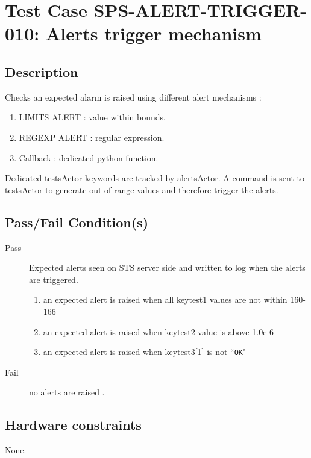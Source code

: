 \section{Test Case SPS-ALERT-TRIGGER-010: Alerts trigger mechanism}

\subsection{Description}

Checks an expected alarm is raised using different alert mechanisms :
\begin{enumerate}
    \item LIMITS ALERT :  value within bounds.
    \item REGEXP ALERT : regular expression.
    \item Callback : dedicated python function.
\end{enumerate}

Dedicated testsActor keywords are tracked by alertsActor.
A command is sent to testsActor to generate out of range values and therefore trigger the alerts.


\subsection{Pass/Fail Condition(s)}

\begin{description}
\item [Pass] Expected alerts seen on STS server side and written to log when the alerts are triggered.

\begin{enumerate}
    \item an expected alert is raised when all keytest1 values are not within 160-166
    \item an expected alert is raised when keytest2 value is above 1.0e-6
    \item an expected alert is raised when keytest3[1] is not ``\texttt{OK}"
\end{enumerate}


\item [Fail] no alerts are raised .
\end{description}

\subsection{Hardware constraints}

None.

